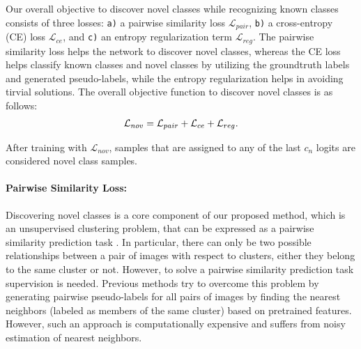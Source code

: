 \documentclass[runningheads]{eccv2022submission}
\newcommand{\txt}[1]{{\texttt{#1}}}
\begin{document}
Our overall objective to discover novel classes while recognizing known classes consists of three losses: \txt{a)} a pairwise similarity loss $\mathcal{L}_{pair}$,  \txt{b)} a cross-entropy (CE) loss $\mathcal{L}_{ce}$, and  \txt{c)} an entropy regularization term $\mathcal{L}_{reg}$. The pairwise similarity loss helps the network to discover novel classes, whereas the CE loss helps classify known classes and novel classes by utilizing the groundtruth labels and generated pseudo-labels, while the entropy regularization helps in avoiding tirvial solutions. The overall objective function to discover novel classes is as follows:
\setlength{\abovedisplayskip}{0pt}
\setlength{\belowdisplayskip}{2pt}
\setlength{\abovedisplayshortskip}{0pt}
\setlength{\belowdisplayshortskip}{0pt}
\begin{align}
\label{eqn:overall}
\vspace{-1mm}
    \mathcal{L}_{nov} = \mathcal{L}_{pair} + \mathcal{L}_{ce} + \mathcal{L}_{reg}. 
\end{align}

After training with $\mathcal{L}_{nov}$, samples that are assigned to any of the last $c_n$ logits are considered novel class samples.

\vspace{-2mm}
\paragraph{\textbf{Pairwise Similarity Loss:}}
\label{par:pair}
Discovering novel classes is a core component of our proposed method, which is an unsupervised clustering problem, that can be expressed as a pairwise similarity prediction task \cite{chang2017deep,wu2019deep}. In particular, there can only be two possible relationships between a pair of images with respect to clusters, either they belong to the same cluster or not. However, to solve a pairwise similarity prediction task supervision is needed. Previous methods \cite{cao2022openworld,Han2020Automatically} try to overcome this problem by generating pairwise pseudo-labels for all pairs of images by finding the nearest neighbors (labeled as members of the same cluster) based on pretrained features. However, such an approach is computationally expensive and suffers from noisy estimation of nearest neighbors.     
\end{document}
